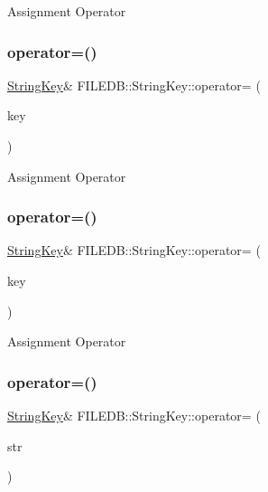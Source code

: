 Assignment Operator \mbox{\label{classFILEDB_1_1StringKey_ab4a0ca971c84abd8b85f6d423163a00f}} 
\subsubsection{\texorpdfstring{operator=()}{operator=()}\hspace{0.1cm}{\footnotesize\ttfamily [2/6]}}
{\footnotesize\ttfamily \mbox{\hyperlink{classFILEDB_1_1StringKey}{String\+Key}}\& F\+I\+L\+E\+D\+B\+::\+String\+Key\+::operator= (\begin{DoxyParamCaption}\item[{const \mbox{\hyperlink{classFILEDB_1_1StringKey}{String\+Key}} \&}]{key }\end{DoxyParamCaption})}

Assignment Operator \mbox{\label{classFILEDB_1_1StringKey_ab4a0ca971c84abd8b85f6d423163a00f}} 
\subsubsection{\texorpdfstring{operator=()}{operator=()}\hspace{0.1cm}{\footnotesize\ttfamily [3/6]}}
{\footnotesize\ttfamily \mbox{\hyperlink{classFILEDB_1_1StringKey}{String\+Key}}\& F\+I\+L\+E\+D\+B\+::\+String\+Key\+::operator= (\begin{DoxyParamCaption}\item[{const \mbox{\hyperlink{classFILEDB_1_1StringKey}{String\+Key}} \&}]{key }\end{DoxyParamCaption})}

Assignment Operator \mbox{\label{classFILEDB_1_1StringKey_ad52c218455b3eb934a68f3d13ab6512e}} 
\subsubsection{\texorpdfstring{operator=()}{operator=()}\hspace{0.1cm}{\footnotesize\ttfamily [4/6]}}
{\footnotesize\ttfamily \mbox{\hyperlink{classFILEDB_1_1StringKey}{String\+Key}}\& F\+I\+L\+E\+D\+B\+::\+String\+Key\+::operator= (\begin{DoxyParamCaption}\item[{const std\+::string \&}]{str }\end{DoxyParamCaption})}

